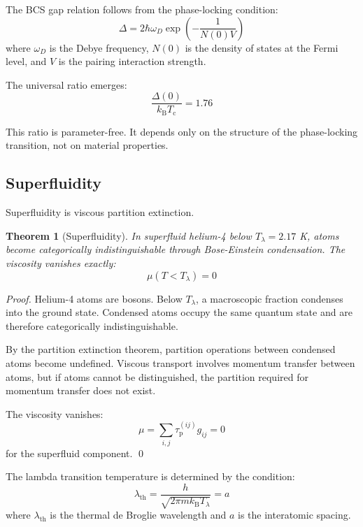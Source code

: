 \documentclass[twocolumn,10pt,aps,prd,superscriptaddress,nofootinbib]{revtex4-2}
\newtheorem{theorem}{Theorem}[section]
\theoremstyle{remark}
\newcommand{\kB}{k_{\mathrm{B}}}
\newcommand{\tauP}{\tau_{\mathrm{p}}}
\newcommand{\Tcrit}{T_{\mathrm{c}}}
\newcommand{\Gij}{g_{ij}}
\begin{document}
The BCS gap relation follows from the phase-locking condition:
\begin{equation}
\Delta = 2\hbar\omega_D \exp\left(-\frac{1}{N(0)V}\right)
\label{eq:bcs_gap}
\end{equation}
where $\omega_D$ is the Debye frequency, $N(0)$ is the density of states at the Fermi level, and $V$ is the pairing interaction strength.

The universal ratio emerges:
\begin{equation}
\frac{\Delta(0)}{\kB \Tcrit} = 1.76
\label{eq:bcs_ratio}
\end{equation}

This ratio is parameter-free. It depends only on the structure of the phase-locking transition, not on material properties.

\subsection{Superfluidity}

Superfluidity is viscous partition extinction.

\begin{theorem}[Superfluidity]
\label{thm:superfluidity}
In superfluid helium-4 below $T_\lambda = 2.17$ K, atoms become categorically indistinguishable through Bose-Einstein condensation. The viscosity vanishes exactly:
\begin{equation}
\mu(T < T_\lambda) = 0
\label{eq:superfluidity}
\end{equation}
\end{theorem}

\begin{proof}
Helium-4 atoms are bosons. Below $T_\lambda$, a macroscopic fraction condenses into the ground state. Condensed atoms occupy the same quantum state and are therefore categorically indistinguishable.

By the partition extinction theorem, partition operations between condensed atoms become undefined. Viscous transport involves momentum transfer between atoms, but if atoms cannot be distinguished, the partition required for momentum transfer does not exist.

The viscosity vanishes:
\begin{equation}
\mu = \sum_{i,j} \tauP^{(ij)} \Gij = 0
\end{equation}
for the superfluid component. \qed
\end{proof}

The lambda transition temperature is determined by the condition:
\begin{equation}
\lambda_{\text{th}} = \frac{h}{\sqrt{2\pi m \kB T_\lambda}} = a
\label{eq:lambda_condition}
\end{equation}
where $\lambda_{\text{th}}$ is the thermal de Broglie wavelength and $a$ is the interatomic spacing.
\end{document}

